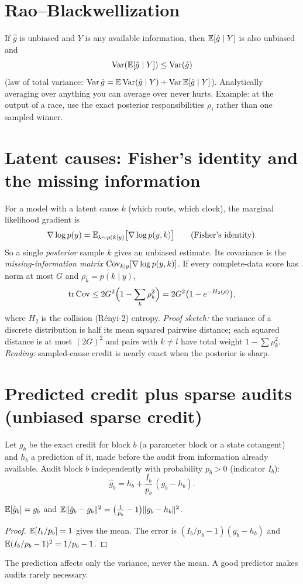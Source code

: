 \documentclass[11pt]{article}
\begin{document}
\section{Rao--Blackwellization}
If $\hat g$ is unbiased and $Y$ is any available information, then $\mathbb{E}[\hat g\mid Y]$ is also unbiased and
\[
\operatorname{Var}(\mathbb{E}[\hat g\mid Y])\le\operatorname{Var}(\hat g)
\]
(law of total variance: $\operatorname{Var}\hat g=\mathbb{E}\operatorname{Var}(\hat g\mid Y)+\operatorname{Var}\mathbb{E}[\hat g\mid Y]$). Analytically averaging over anything you can
average over never hurts. Example: at the output of a race, use the exact posterior responsibilities $\rho_i$ rather than one
sampled winner.

\section{Latent causes: Fisher's identity and the missing information}
For a model with a latent cause $k$ (which route, which clock), the marginal likelihood gradient is
\[
\nabla\log p(y)=\mathbb{E}_{k\sim p(k\mid y)}\big[\nabla\log p(y,k)\big]\qquad\text{(Fisher's identity).}
\]
So a single \emph{posterior} sample $k$ gives an unbiased estimate. Its covariance is the \emph{missing-information matrix}
$\operatorname{Cov}_{k\mid y}[\nabla\log p(y,k)]$. If every complete-data score has norm at most $G$ and $\rho_k=p(k\mid y)$,
\[
\operatorname{tr}\operatorname{Cov}\le 2G^2\Big(1-\sum_k\rho_k^2\Big)=2G^2\big(1-e^{-H_2(\rho)}\big),
\]
where $H_2$ is the collision (R\'enyi-2) entropy. \emph{Proof sketch:} the variance of a discrete distribution is half its mean
squared pairwise distance; each squared distance is at most $(2G)^2$ and pairs with $k\ne l$ have total weight $1-\sum\rho_k^2$.
\emph{Reading:} sampled-cause credit is nearly exact when the posterior is sharp.

\section{Predicted credit plus sparse audits (unbiased sparse credit)}
Let $g_b$ be the exact credit for block $b$ (a parameter block or a state cotangent) and $h_b$ a prediction of it, made before the
audit from information already available. Audit block $b$ independently with probability $p_b>0$ (indicator $I_b$):
\[
\hat g_b=h_b+\frac{I_b}{p_b}\,(g_b-h_b).
\]
\begin{proposition}
$\mathbb{E}[\hat g_b]=g_b$ and $\mathbb{E}\|\hat g_b-g_b\|^2=\big(\tfrac1{p_b}-1\big)\|g_b-h_b\|^2$.
\end{proposition}
\begin{proof}
$\mathbb{E}[I_b/p_b]=1$ gives the mean. The error is $(I_b/p_b-1)(g_b-h_b)$ and $\mathbb{E}(I_b/p_b-1)^2=1/p_b-1$.
\end{proof}
The prediction affects only the variance, never the mean. A good predictor makes audits rarely necessary.
\end{document}
